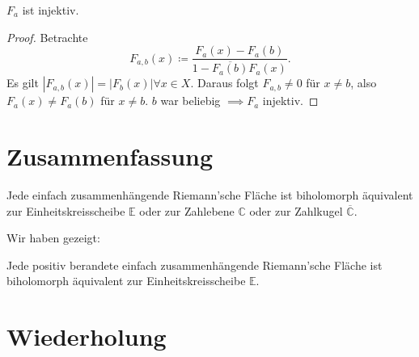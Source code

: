 \documentclass{beamer}
\newcommand{\C}{\mathbb{C}}
\newcommand{\E}{\mathbb{E}}
\begin{document}
    \begin{frame}
        \begin{lemma}
            $F_a$ ist injektiv.
        \end{lemma}
        \begin{proof}
            Betrachte $$F_{a,b}(x) \coloneqq \frac{F_a(x) - F_a(b)}{1 - \overline{F_a(b)}F_a(x)}.$$
            Es gilt $|F_{a,b}(x)| = |F_b(x)| \forall x\in X$.
            Daraus folgt $F_{a,b} \neq 0$ für $x \neq b$, also $F_a(x) \neq F_a(b)$ für $x\neq b$. $b$ war beliebig $\implies F_a$ injektiv.
        \end{proof}
    \end{frame}
    
    \section{Zusammenfassung}
    \begin{frame}
        \begin{theorem}[Uniformisierungssatz]
            Jede einfach zusammenhängende Riemann'sche Fläche ist biholomorph äquivalent zur Einheitskreisscheibe $\E$ oder zur Zahlebene $\C$ oder zur Zahlkugel $\overline{\C}$.
        \end{theorem}
        Wir haben gezeigt:
        \begin{lemma}
            Jede positiv berandete einfach zusammenhängende Riemann'sche Fläche ist biholomorph äquivalent zur Einheitskreisscheibe $\E$.
        \end{lemma}
    \end{frame}

    \section{Wiederholung}
    
    
\end{document}
